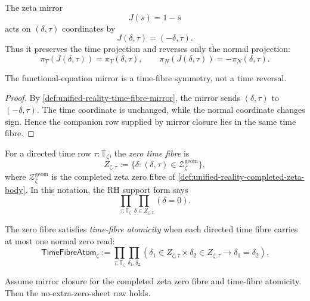 \begin{definition}
\label{def:unified-reality-time-fibre-mirror}
The zeta mirror
$$
J(s)=1-\overline{s}
$$
acts on $(\delta,\tau)$ coordinates by
$$
J(\delta,\tau)=(-\delta,\tau).
$$
Thus it preserves the time projection and reverses only the normal
projection:
$$
\pi_T(J(\delta,\tau))=\pi_T(\delta,\tau),
\qquad
\pi_N(J(\delta,\tau))=-\pi_N(\delta,\tau).
$$
\end{definition}

\begin{theorem}
\label{thm:unified-reality-zeta-mirror-fibrewise-in-time}
The functional-equation mirror is a time-fibre symmetry, not a time
reversal.
\end{theorem}

\begin{proof}
By \autoref{def:unified-reality-time-fibre-mirror}, the mirror sends
$(\delta,\tau)$ to $(-\delta,\tau)$.  The time coordinate is unchanged,
while the normal coordinate changes sign.  Hence the companion row
supplied by mirror closure lies in the same time fibre.
\end{proof}

\begin{definition}
\label{def:unified-reality-zero-time-fibre}
For a directed time row $\tau:\mathbb T_{\zeta}$, the \emph{zero time
fibre} is
$$
Z_{\zeta,\tau}
:=
\{\delta:(\delta,\tau)\in\mathcal Z_{\zeta}^{\mathrm{geom}}\},
$$
where $\mathcal Z_{\zeta}^{\mathrm{geom}}$ is the completed zeta
zero fibre of
\autoref{def:unified-reality-completed-zeta-body}.  In this notation,
the RH support form says
$$
\prod_{\tau:\mathbb T_{\zeta}}
\prod_{\delta\in Z_{\zeta,\tau}}
(\delta=0).
$$
\end{definition}

\begin{definition}
\label{def:unified-reality-time-fibre-atomicity}
The zero fibre satisfies \emph{time-fibre atomicity} when each directed
time fibre carries at most one normal zero read:
$$
\mathsf{TimeFibreAtom}_{\zeta}
:=
\prod_{\tau:\mathbb T_{\zeta}}
\prod_{\delta_1,\delta_2}
\left(
\delta_1\in Z_{\zeta,\tau}
\times
\delta_2\in Z_{\zeta,\tau}
\to
\delta_1=\delta_2
\right).
$$
\end{definition}

\begin{theorem}
\label{thm:unified-reality-mirror-time-fibre-atomicity-no-extra-sheet}
Assume mirror closure for the completed zeta zero fibre and
time-fibre atomicity.  Then the no-extra-zero-sheet row holds.
\end{theorem}

